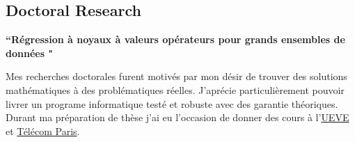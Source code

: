 \documentclass[10pt]{article} %
\begin{document}
\begin{paracol}{2}
\section{Doctoral Research}
%
{\raggedright\textbf{``Régression à noyaux à valeurs opérateurs pour grands ensembles de données
"} \\}
Mes recherches doctorales furent motivés par mon désir de trouver des solutions
mathématiques à des problématiques réelles. J'aprécie particulièrement pouvoir
livrer un programe informatique testé et robuste avec des garantie théoriques.
Durant ma préparation de thèse j'ai eu l'occasion de donner des cours à
l'\href{https://www.univ-evry.fr/accueil.html}{UEVE} et
\href{https://www.telecom-paris.fr/}{T\'el\'ecom Paris}.
%
%
%
%
%
%
%
%
%
%
%
%

%
%

\end{paracol}
\end{document}
